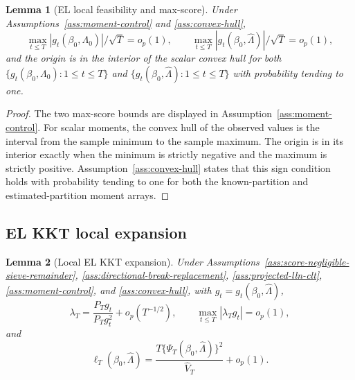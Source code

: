 \documentclass[12pt]{article}
\numberwithin{equation}{section}
\newtheorem{lemma}{Lemma}
\theoremstyle{definition}
\newcommand{\op}{o_p}
\begin{document}
\begin{lemma}[EL local feasibility and max-score]
\label{lem:part2-el-feasibility}
Under Assumptions~\ref{ass:moment-control} and \ref{ass:convex-hull},
\[
    \max_{t\le T}|g_t(\beta_0,\Lambda_0)|/\sqrt T=\op(1),
    \qquad
    \max_{t\le T}|g_t(\beta_0,\widehat\Lambda)|/\sqrt T=\op(1),
\]
and the origin is in the interior of the scalar convex hull for both
\(\{g_t(\beta_0,\Lambda_0):1\le t\le T\}\) and
\(\{g_t(\beta_0,\widehat\Lambda):1\le t\le T\}\) with probability tending to
one.
\end{lemma}

\begin{proof}
The two max-score bounds are displayed in Assumption~\ref{ass:moment-control}.
For scalar moments, the convex hull of the observed values is the interval from
the sample minimum to the sample maximum. The origin is in its interior exactly
when the minimum is strictly negative and the maximum is strictly positive.
Assumption~\ref{ass:convex-hull} states that this sign condition holds with
probability tending to one for both the known-partition and estimated-partition
moment arrays.
\end{proof}

\subsection{EL KKT local expansion}

\begin{lemma}[Local EL KKT expansion]
\label{lem:part2-el-local-expansion}
Under Assumptions~\ref{ass:score-negligible-sieve-remainder}, \ref{ass:directional-break-replacement}, \ref{ass:projected-lln-clt}, \ref{ass:moment-control}, and \ref{ass:convex-hull},
with \(g_t=g_t(\beta_0,\widehat\Lambda)\),
\[
    \lambda_T=\frac{P_Tg_t}{P_Tg_t^2}+\op(T^{-1/2}),
    \qquad
    \max_{t\le T}|\lambda_Tg_t|=\op(1),
\]
and
\[
    \ell_T(\beta_0,\widehat\Lambda)
    =\frac{T\{\Psi_T(\beta_0,\widehat\Lambda)\}^2}{\widehat V_T}
     +\op(1).
\]
\end{lemma}
\end{document}
